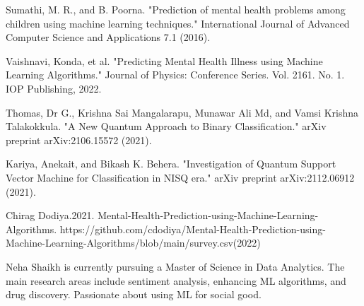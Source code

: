 \documentclass[10pt,journal,compsoc]{IEEEtran}
\begin{document}
%
%
%
\begin{thebibliography}{1}

Sumathi, M. R., and B. Poorna. "Prediction of mental health problems among children using machine learning techniques." International Journal of Advanced Computer Science and Applications 7.1 (2016).

Vaishnavi, Konda, et al. "Predicting Mental Health Illness using Machine Learning Algorithms." Journal of Physics: Conference Series. Vol. 2161. No. 1. IOP Publishing, 2022.

Thomas, Dr G., Krishna Sai Mangalarapu, Munawar Ali Md, and Vamsi Krishna Talakokkula. "A New Quantum Approach to Binary Classification." arXiv preprint arXiv:2106.15572 (2021).

Kariya, Anekait, and Bikash K. Behera. "Investigation of Quantum Support Vector Machine for Classification in NISQ era." arXiv preprint arXiv:2112.06912 (2021).

Chirag Dodiya.2021. Mental-Health-Prediction-using-Machine-Learning-Algorithms. https://github.com/cdodiya/Mental-Health-Prediction-using-Machine-Learning-Algorithms/blob/main/survey.csv(2022)

\end{thebibliography}

% 

\begin{IEEEbiographynophoto}{Neha Shaikh}
is currently pursuing a Master of Science in Data Analytics. The main research areas include sentiment analysis, enhancing ML algorithms, and drug discovery.
Passionate about using ML for social good. 
\end{IEEEbiographynophoto}
\end{document}
